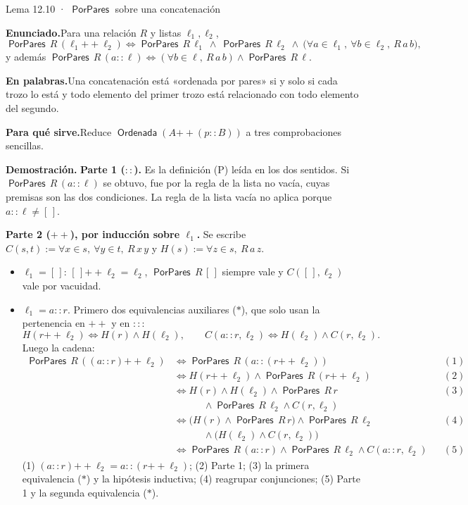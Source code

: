 \documentclass[11pt,a4paper]{article}
\newcommand{\campo}[1]{\par\smallskip\noindent\textbf{#1}\enspace}
\newcommand{\enunciado}{\campo{Enunciado.}}
\newcommand{\palabras}{\campo{En palabras.}}
\newcommand{\sirve}{\campo{Para qué sirve.}}
\newcommand{\prueba}{\campo{Demostración.}}
\newcommand{\concat}{\mathbin{+\!\!+}}
\newcommand{\Sorted}{\operatorname{\mathsf{Ordenada}}}
\newcommand{\Pairwise}{\operatorname{\mathsf{PorPares}}}
\begin{document}
\begin{resultado}{Lema 12.10 · \(\Pairwise\) sobre una concatenación}
\enunciado Para una relación \(R\) y listas \(\ell_1,\ell_2\),
\[
\Pairwise\,R\,(\ell_1\concat\ell_2)\iff
\Pairwise\,R\,\ell_1\ \wedge\ \Pairwise\,R\,\ell_2\ \wedge\
\big(\forall a\in\ell_1,\ \forall b\in\ell_2,\ R\,a\,b\big),
\]
y además \(\Pairwise\,R\,(a::\ell)\iff(\forall b\in\ell,\ R\,a\,b)\wedge\Pairwise\,R\,\ell\).

\palabras Una concatenación está «ordenada por pares» si y solo si cada
trozo lo está y todo elemento del primer trozo está relacionado con todo
elemento del segundo.

\sirve Reduce \(\Sorted(A\concat(p::B))\) a tres comprobaciones sencillas.

\prueba
\textbf{Parte 1 (\(::\)).} Es la definición (P) leída en los dos sentidos.
Si \(\Pairwise\,R\,(a::\ell)\) se obtuvo, fue por la regla de la lista no
vacía, cuyas premisas son las dos condiciones. La regla de la lista vacía no
aplica porque \(a::\ell\neq[\,]\).

\textbf{Parte 2 (\(\concat\)), por inducción sobre \(\ell_1\).} Se escribe
\(C(s,t):=\forall x\in s,\ \forall y\in t,\ R\,x\,y\) y
\(H(s):=\forall z\in s,\ R\,a\,z\).
\begin{itemize}
  \item \(\ell_1=[\,]\): \([\,]\concat\ell_2=\ell_2\), \(\Pairwise\,R\,[\,]\)
    siempre vale y \(C([\,],\ell_2)\) vale por vacuidad.
  \item \(\ell_1=a::r\). Primero dos equivalencias auxiliares (\(\ast\)),
    que solo usan la pertenencia en \(\concat\) y en \(::\):
    \[
    H(r\concat\ell_2)\iff H(r)\wedge H(\ell_2),\qquad
    C(a::r,\ell_2)\iff H(\ell_2)\wedge C(r,\ell_2).
    \]
    Luego la cadena:
    \[
    \begin{aligned}
    \Pairwise\,R\,((a::r)\concat\ell_2)
    &\iff \Pairwise\,R\,(a::(r\concat\ell_2)) &&(1)\\
    &\iff H(r\concat\ell_2)\wedge\Pairwise\,R\,(r\concat\ell_2) &&(2)\\
    &\iff H(r)\wedge H(\ell_2)\wedge\Pairwise\,R\,r &&(3)\\
    &\qquad\quad\wedge\Pairwise\,R\,\ell_2\wedge C(r,\ell_2)\\
    &\iff \big(H(r)\wedge\Pairwise\,R\,r\big)\wedge\Pairwise\,R\,\ell_2 &&(4)\\
    &\qquad\quad\wedge\big(H(\ell_2)\wedge C(r,\ell_2)\big)\\
    &\iff \Pairwise\,R\,(a::r)\wedge\Pairwise\,R\,\ell_2\wedge C(a::r,\ell_2) &&(5)
    \end{aligned}
    \]
    (1) \((a::r)\concat\ell_2=a::(r\concat\ell_2)\); (2) Parte 1;
    (3) la primera equivalencia (\(\ast\)) y la hipótesis inductiva;
    (4) reagrupar conjunciones; (5) Parte 1 y la segunda equivalencia
    (\(\ast\)).
\end{itemize}
\end{resultado}
\end{document}
